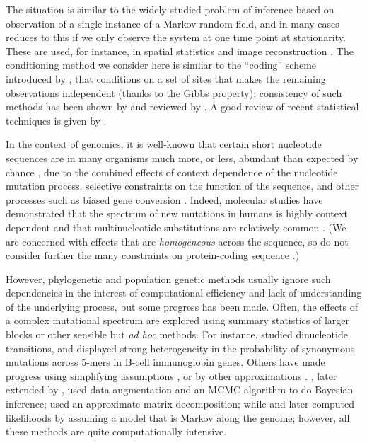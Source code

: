 \documentclass{article}
\theoremstyle{plain}
\theoremstyle{definition}
\begin{document}
The situation is similar to the widely-studied problem of inference based on observation
of a single instance of a Markov random field,
and in many cases reduces to this if we only observe the system at one time point at stationarity.
These are used, for instance, in spatial statistics \citep{besag1972nearestneighbour,gelfand2010handbook}
and image reconstruction \citep{geman1984stochastic,besag1986statistical}.
The conditioning method we consider here
is simliar to the ``coding'' scheme introduced by \citet{besag1974spatial},
that conditions on a set of sites that makes the remaining observations independent (thanks to the Gibbs property);
consistency of such methods has been shown by \citet{comets1992consistency} and reviewed by \citet{larribe2011composite}.
A good review of recent statistical techniques is given by \citet{friel2012bayesian}.


In the context of genomics,
it is well-known that certain short nucleotide sequences
are in many organisms much more, or less, abundant than expected by chance \citep{burge1992underrepresentation},
due to the combined effects of context dependence of the nucleotide mutation process,
selective constraints on the function of the sequence,
and other processes such as biased gene conversion \citep{duret2009biased}.
Indeed, molecular studies have demonstrated that the spectrum of new mutations in humans
is highly context dependent \citep{schaibley2013influence}
and that multinucleotide substitutions are relatively common \citep{schrider2011pervasive,terekhanova2013prevalence,harris2013errorprone}.
(We are concerned with effects that are \emph{homogeneous} across the sequence,
so do not consider further the many constraints on protein-coding sequence \citep[reviewed in][]{thorne2007protein}.)

However, phylogenetic and population genetic methods usually ignore such dependencies
in the interest of computational efficiency and lack of understanding of the underlying process,
but some progress has been made.
Often, the effects of a complex mutational spectrum are explored using summary statistics of larger blocks or other sensible but \textit{ad hoc} methods.
For instance, \citet{arndt2003sequence} studied dinucleotide transitions,
and \citet{yaari2013models} displayed strong heterogeneity in the probability of synonymous mutations across 5-mers
in B-cell immunoglobin genes.
Others have made progress using simplifying assumptions \citep{berard2012accurate},
or by other approximations \citep{christensen2005pseudolikelihood}.
\citet{pedersen2000dependent}, later extended by
\citet{hobolth2008markov,baele2010using}, used data augmentation and an MCMC algorithm to do Bayesian inference;
\citet{lunter2004nucleotide} used an approximate matrix decomposition;
while \citet{siepel2004phylogenetic} and later \citep{baele2010modelling} computed likelihoods by assuming a model that is Markov along the genome;
however, all these methods are quite computationally intensive.
\end{document}
